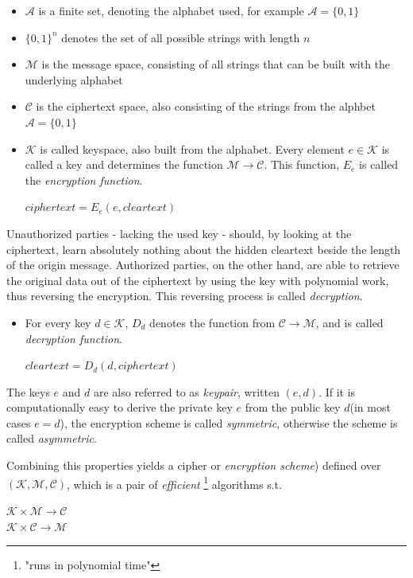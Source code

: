 \begin{itemize}
 \item $\mathcal{A}$ is a finite set, denoting the alphabet used, for example
 $\mathcal{A} = \{0, 1\}$
 \item $\{0, 1\}^n$ denotes the set of all possible strings with length $n$
 \item $\mathcal{M}$ is the message space, consisting of all strings that can be built with the 
 underlying alphabet
 \item $\mathcal{C}$ is the ciphertext space, also consisting of the strings from 
 the alphbet
$\mathcal{A} = \{0, 1\}$

\item $\mathcal{K}$ is called keyspace, also built from the alphabet. Every element
 $e \in \mathcal{K}$ is called a key and determines the function $\mathcal{M} \rightarrow \mathcal{C}$.
 This function, $E_e$ is called the \textit{encryption function}. 
  \begin{center}
 $ciphertext = E_e(e, cleartext)$
  \end{center}
\end{itemize}

Unauthorized parties - lacking the used key - should, by looking at the ciphertext, learn
absolutely nothing about the hidden cleartext beside the length of the origin message. Authorized parties, on the other hand, are
able to retrieve the original data out of the ciphertext by using the key with polynomial work, thus reversing
the encryption. This reversing process is called \textit{decryption}.

\begin{itemize}

 \item For every key $d \in \mathcal{K}$, $D_d$ denotes the function from $\mathcal{C} \rightarrow
  \mathcal{M}$, and is called \textit{decryption function}.
  \begin{center}
  $cleartext  = D_d(d, ciphertext)$
    \end{center}
\end{itemize}

The keys $e$ and $d$ are also referred to as \textit{keypair}, written $(e,d)$. 
If it is computationally easy to derive the private key $e$ from the public key $d$(in most cases $e = d$), the encryption scheme
 is called \textit{symmetric}, otherwise the scheme is called \textit{asymmetric}.

Combining this properties yields a cipher or \textit{encryption scheme}) defined over $\mathcal{(K,M,C)}$, which is a pair of \textit{efficient}
 \footnote{"runs in polynomial time"} algorithms s.t.
 \begin{center}
   $\mathcal{K} \times \mathcal{M} \rightarrow \mathcal{C}$
   \\
   $\mathcal{K} \times \mathcal{C} \rightarrow \mathcal{M}$
 \end{center}

